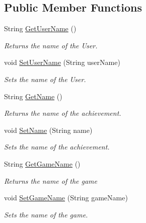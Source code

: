 \subsection*{Public Member Functions}
\begin{DoxyCompactItemize}
\item 
String \hyperlink{classcom_1_1shephertz_1_1app42_1_1paas_1_1sdk_1_1windows_1_1achievement_1_1_achievement_acaafbf0d02e3c557156d89fc8be4572f}{Get\+User\+Name} ()
\begin{DoxyCompactList}\small\item\em Returns the name of the User. \end{DoxyCompactList}\item 
void \hyperlink{classcom_1_1shephertz_1_1app42_1_1paas_1_1sdk_1_1windows_1_1achievement_1_1_achievement_a288db3e4b2d4762e3b90d60c8d79db12}{Set\+User\+Name} (String user\+Name)
\begin{DoxyCompactList}\small\item\em Sets the name of the User. \end{DoxyCompactList}\item 
String \hyperlink{classcom_1_1shephertz_1_1app42_1_1paas_1_1sdk_1_1windows_1_1achievement_1_1_achievement_ad4100d9574617c3672ec5001106b87d0}{Get\+Name} ()
\begin{DoxyCompactList}\small\item\em Returns the name of the achievement. \end{DoxyCompactList}\item 
void \hyperlink{classcom_1_1shephertz_1_1app42_1_1paas_1_1sdk_1_1windows_1_1achievement_1_1_achievement_a84461296d4c3930ebd588b546076eecc}{Set\+Name} (String name)
\begin{DoxyCompactList}\small\item\em Sets the name of the achievement. \end{DoxyCompactList}\item 
String \hyperlink{classcom_1_1shephertz_1_1app42_1_1paas_1_1sdk_1_1windows_1_1achievement_1_1_achievement_a2c793d21f62d74d2252c45f9fcb761e1}{Get\+Game\+Name} ()
\begin{DoxyCompactList}\small\item\em Returns the name of the game \end{DoxyCompactList}\item 
void \hyperlink{classcom_1_1shephertz_1_1app42_1_1paas_1_1sdk_1_1windows_1_1achievement_1_1_achievement_a214f86004df52da17bd8f27390cd3129}{Set\+Game\+Name} (String game\+Name)
\begin{DoxyCompactList}\small\item\em Sets the name of the game. \end{DoxyCompactList}\item 

\end{DoxyCompactItemize}
